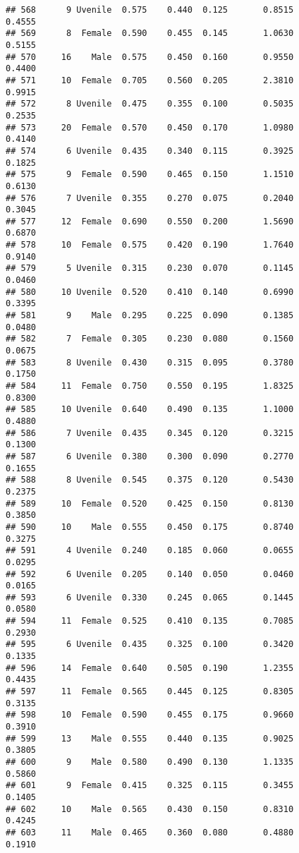 \documentclass[
]{article}
\begin{document}
\begin{verbatim}
## 568      9 Uvenile  0.575    0.440  0.125       0.8515         0.4555
## 569      8  Female  0.590    0.455  0.145       1.0630         0.5155
## 570     16    Male  0.575    0.450  0.160       0.9550         0.4400
## 571     10  Female  0.705    0.560  0.205       2.3810         0.9915
## 572      8 Uvenile  0.475    0.355  0.100       0.5035         0.2535
## 573     20  Female  0.570    0.450  0.170       1.0980         0.4140
## 574      6 Uvenile  0.435    0.340  0.115       0.3925         0.1825
## 575      9  Female  0.590    0.465  0.150       1.1510         0.6130
## 576      7 Uvenile  0.355    0.270  0.075       0.2040         0.3045
## 577     12  Female  0.690    0.550  0.200       1.5690         0.6870
## 578     10  Female  0.575    0.420  0.190       1.7640         0.9140
## 579      5 Uvenile  0.315    0.230  0.070       0.1145         0.0460
## 580     10 Uvenile  0.520    0.410  0.140       0.6990         0.3395
## 581      9    Male  0.295    0.225  0.090       0.1385         0.0480
## 582      7  Female  0.305    0.230  0.080       0.1560         0.0675
## 583      8 Uvenile  0.430    0.315  0.095       0.3780         0.1750
## 584     11  Female  0.750    0.550  0.195       1.8325         0.8300
## 585     10 Uvenile  0.640    0.490  0.135       1.1000         0.4880
## 586      7 Uvenile  0.435    0.345  0.120       0.3215         0.1300
## 587      6 Uvenile  0.380    0.300  0.090       0.2770         0.1655
## 588      8 Uvenile  0.545    0.375  0.120       0.5430         0.2375
## 589     10  Female  0.520    0.425  0.150       0.8130         0.3850
## 590     10    Male  0.555    0.450  0.175       0.8740         0.3275
## 591      4 Uvenile  0.240    0.185  0.060       0.0655         0.0295
## 592      6 Uvenile  0.205    0.140  0.050       0.0460         0.0165
## 593      6 Uvenile  0.330    0.245  0.065       0.1445         0.0580
## 594     11  Female  0.525    0.410  0.135       0.7085         0.2930
## 595      6 Uvenile  0.435    0.325  0.100       0.3420         0.1335
## 596     14  Female  0.640    0.505  0.190       1.2355         0.4435
## 597     11  Female  0.565    0.445  0.125       0.8305         0.3135
## 598     10  Female  0.590    0.455  0.175       0.9660         0.3910
## 599     13    Male  0.555    0.440  0.135       0.9025         0.3805
## 600      9    Male  0.580    0.490  0.130       1.1335         0.5860
## 601      9  Female  0.415    0.325  0.115       0.3455         0.1405
## 602     10    Male  0.565    0.430  0.150       0.8310         0.4245
## 603     11    Male  0.465    0.360  0.080       0.4880         0.1910

\end{verbatim}
\end{document}
